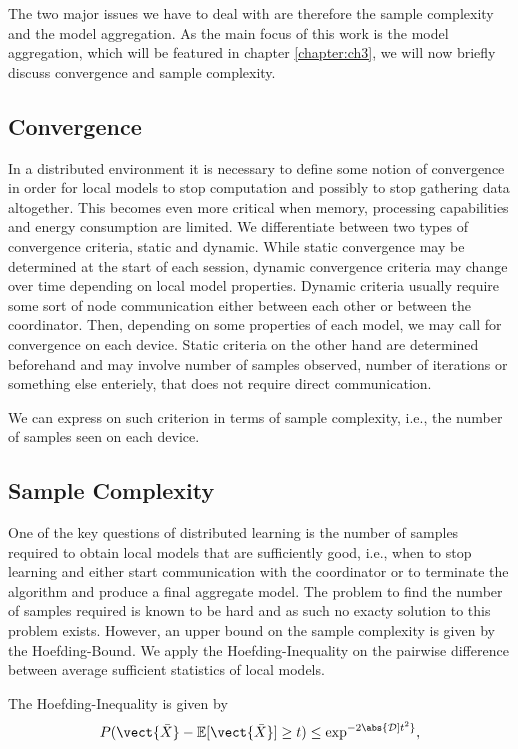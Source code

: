 The two major issues we have to deal with are therefore the sample complexity and the model aggregation.
As the main focus of this work is the model aggregation, which will be featured in chapter \ref{chapter:ch3}, we will now briefly discuss convergence and sample complexity.

\subsection{Convergence}
In a distributed environment it is necessary to define some notion of convergence in order for local models to stop computation and possibly to stop gathering data altogether.
This becomes even more critical when memory, processing capabilities and energy consumption are limited.
We differentiate between two types of convergence criteria, static and dynamic.
While static convergence may be determined at the start of each session, dynamic convergence criteria may change over time depending on local model properties.
Dynamic criteria usually require some sort of node communication either between each other or between the coordinator. 
Then, depending on some properties of each model, we may call for convergence on each device.
Static criteria on the other hand are determined beforehand and may involve number of samples observed, number of iterations or something else enteriely, that does not require direct communication.

We can express on such criterion in terms of sample complexity, i.e., the number of samples seen on each device.

\subsection{Sample Complexity}
One of the key questions of distributed learning is the number of samples required to obtain local models that are sufficiently good, i.e., when to stop learning and either start communication with the coordinator
or to terminate the algorithm and produce a final aggregate model. 
The problem to find the number of samples required is known to be hard  and as such no exacty solution to this problem exists.
However, an upper bound on the sample complexity is given by the Hoefding-Bound. 
We apply the Hoefding-Inequality on the pairwise difference between average sufficient statistics of local models.

The Hoefding-Inequality is given by
\begin{equation}
    P(\vect{\bar{X}} - \mathbb{E}[\vect{\bar{X}}] \geq t ) \leq \exp^{-2\abs{\mathcal{D}]t^2}},
\end{equation}

